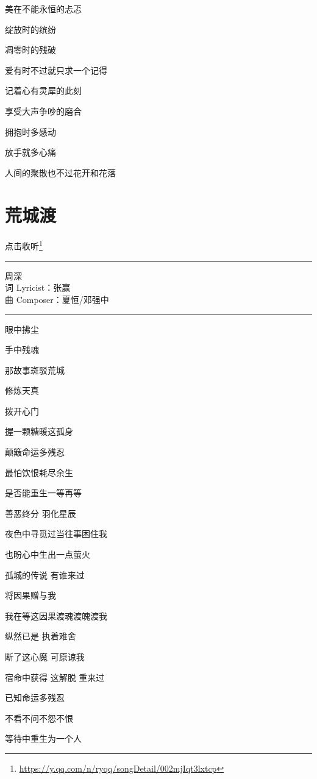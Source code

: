 \documentclass[]{ctexbook}
\renewcommand{\href}[2]{#2\footnote{\url{#1}}}
\begin{document}
美在不能永恒的忐忑

绽放时的缤纷

凋零时的残破

爱有时不过就只求一个记得

记着心有灵犀的此刻

享受大声争吵的磨合

拥抱时多感动

放手就多心痛

人间的聚散也不过花开和花落

\section*{荒城渡}\label{huangchengdu}


\href{https://y.qq.com/n/ryqq/songDetail/002mjIqt3lxtcp}{点击收听}

\begin{center}\rule{0.5\linewidth}{0.5pt}\end{center}

周深\\
词 Lyricist：张赢\\
曲 Composer：夏恒/邓强中

\begin{center}\rule{0.5\linewidth}{0.5pt}\end{center}

眼中拂尘

手中残魂

那故事斑驳荒城

修炼天真

拨开心门

握一颗糖暖这孤身

颠簸命运多残忍

最怕饮恨耗尽余生

是否能重生一等再等

善恶终分 羽化星辰

夜色中寻觅过当往事困住我

也盼心中生出一点萤火

孤城的传说 有谁来过

将因果赠与我

我在等这因果渡魂渡魄渡我

纵然已是 执着难舍

断了这心魔 可原谅我

宿命中获得 这解脱 重来过

已知命运多残忍

不看不问不怨不恨

等待中重生为一个人
\end{document}
